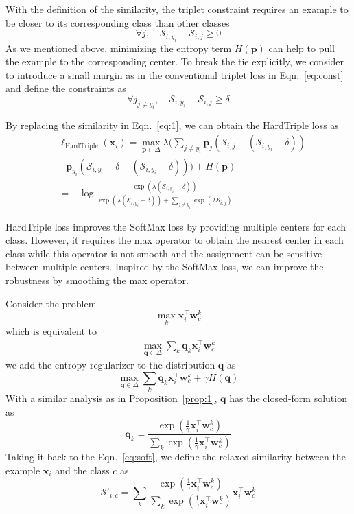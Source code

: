 \documentclass[10pt,twocolumn,letterpaper]{article}
\def \x {\mathbf{x}}
\def \p {\mathbf{p}}
\def \q {\mathbf{q}}
\def \q {\mathbf{q}}
\def \w {\mathbf{w}}
\begin{document}
With the definition of the similarity, the triplet constraint requires an example to be closer to its corresponding class than other classes
\[\forall j,\quad \mathcal{S}_{i,y_i} -\mathcal{S}_{i,j}\geq 0\]
As we mentioned above, minimizing the entropy term $H(\p)$ can help to pull the example to the corresponding center. To break the tie explicitly, we consider to introduce a small margin as in the conventional triplet loss in Eqn.~\ref{eq:const} and define the constraints as
\[\forall j_{j\not = y_i}, \quad \mathcal{S}_{i,y_{i}} - \mathcal{S}_{i,j}\geq \delta\]

By replacing the similarity in Eqn.~\ref{eq:1}, we can obtain the HardTriple loss as
\begin{align}\label{eq:hardtrip}
&\ell_{\mathrm{HardTriple}}(\x_i) = \max_{\p\in\Delta} \lambda\bigg(\sum_{j\not=y_i} \p_j (\mathcal{S}_{i,j} - (\mathcal{S}_{i,y_i}-\delta))\nonumber\\
&+\p_{y_i}(\mathcal{S}_{i,y_i} - \delta - (\mathcal{S}_{i,y_i}-\delta))\bigg)+ H(\p)\nonumber\\
&=-\log\frac{\exp(\lambda(\mathcal{S}_{i,y_i}-\delta))}{\exp(\lambda(\mathcal{S}_{i,y_i}-\delta))+\sum_{j\not=y_i}\exp(\lambda\mathcal{S}_{i,j})  }
\end{align}

HardTriple loss improves the SoftMax loss by providing multiple centers for each class. However, it requires the max operator to obtain the nearest center in each class while this operator is not smooth and the assignment can be sensitive between multiple centers. Inspired by the SoftMax loss, we can improve the robustness by smoothing the max operator.

Consider the problem
\[\max_k\x_i^\top\w_c^k\]
which is equivalent to
\begin{eqnarray}\label{eq:soft}
\max_{\q\in\Delta}\sum_k \q_k \x_i^\top \w_c^k
\end{eqnarray}
we add the entropy regularizer to the distribution $\q$ as
\[\max_{\q\in\Delta}\sum_k \q_k \x_i^\top \w_c^k+\gamma H(\q)\]
With a similar analysis as in Proposition~\ref{prop:1}, $\q$ has the closed-form solution as
\[\q_k = \frac{\exp(\frac{1}{\gamma}\x_i^\top \w_c^k)}{\sum_k \exp(\frac{1}{\gamma}\x_i^\top \w_c^k)}\]
Taking it back to the Eqn.~\ref{eq:soft}, we define the relaxed similarity between the example $\x_i$ and the class $c$ as
\[\mathcal{S}'_{i,c} = \sum_k  \frac{\exp(\frac{1}{\gamma}\x_i^\top \w_c^k)}{\sum_k \exp(\frac{1}{\gamma}\x_i^\top \w_c^k)}\x_i^\top \w_c^k\]
\end{document}
